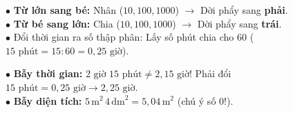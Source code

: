 \documentclass[14pt,a4paper,oneside]{extbook}
\begin{document}
\vspace{3mm}

\noindent
\begin{minipage}[t]{0.54\textwidth}
  \begin{tcolorbox}[
    enhanced,
    title={\footnotesize\bfseries\color{white}\faExchange\ Kỹ thuật dời dấu phẩy đổi đơn vị},
    colback=green!3!white,
    colframe=green!60!black,
    arc=2.5mm, boxrule=0.8pt, top=1.8mm, bottom=1.8mm, left=2.2mm, right=2.2mm
  ]
    \footnotesize
    $\bullet$ \textbf{Từ lớn sang bé:} Nhân ($10, 100, 1000$) $\rightarrow$ Dời phẩy sang \textbf{phải}.\\
    $\bullet$ \textbf{Từ bé sang lớn:} Chia ($10, 100, 1000$) $\rightarrow$ Dời phẩy sang \textbf{trái}.\\
    $\bullet$ Đổi thời gian ra số thập phân: Lấy số phút chia cho $60$ ($15\text{ phút} = 15 : 60 = 0,25\text{ giờ}$).
  \end{tcolorbox}
\end{minipage}%
\hfill
\begin{minipage}[t]{0.44\textwidth}
  \begin{tcolorbox}[
    enhanced,
    title={\footnotesize\bfseries\color{white}\faExclamationTriangle\ Mẹo tránh bẫy trắc nghiệm},
    colback=red!2!white,
    colframe=red!70!black,
    arc=2.5mm, boxrule=0.8pt, top=1.8mm, bottom=1.8mm, left=2.2mm, right=2.2mm
  ]
    \footnotesize
    $\bullet$ \textbf{Bẫy thời gian:} $2\text{ giờ } 15\text{ phút} \neq 2,15\text{ giờ}$! Phải đổi $15\text{ phút} = 0,25\text{ giờ} \rightarrow 2,25\text{ giờ}$.\\
    $\bullet$ \textbf{Bẫy diện tích:} $5\,\text{m}^2\,4\,\text{dm}^2 = 5,04\,\text{m}^2$ (chú ý số 0!).
  \end{tcolorbox}
\end{minipage}
\end{document}
